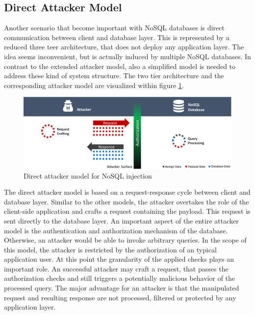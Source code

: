 \subsection{Direct Attacker Model}
Another scenario that become important with NoSQL databases is direct communication between client and database layer. This is represented by a reduced three teer architecture, that does not deploy any application layer. The idea seems inconvenient, but is actually induced by multiple NoSQL databases. In contrast to the extended attacker model, also a simplified model is needed to address these kind of system structure. The two tier architecture and the corresponding attacker model are visualized within figure \ref{fig:directAttackerModel}.

\begin{figure}[h]
\centering
  \includegraphics[width=1\linewidth]{Images/attacker_model_direct}
  \caption{Direct attacker model for NoSQL injection}
  \label{fig:directAttackerModel}
\end{figure}

The direct attacker model is based on a request-response cycle between client and database layer. Similar to the other models, the attacker overtakes the role of the client-side application and crafts a request containing the payload. This request is sent directly to the database layer. An important aspect of the entire attacker model is the authentication and authorization mechanism of the database. Otherwise, an attacker would be able to invoke arbitrary queries. In the scope of this model, the attacker is restricted by the authorization of an typical application user. At this point the granularity of the applied checks plays an important role. An successful attacker may craft a request, that passes the authorization checks and still triggers a potentially malicious behavior of the processed query. The major advantage for an attacker is that the manipulated request and resulting response are not processed, filtered or protected by any application layer. \\

